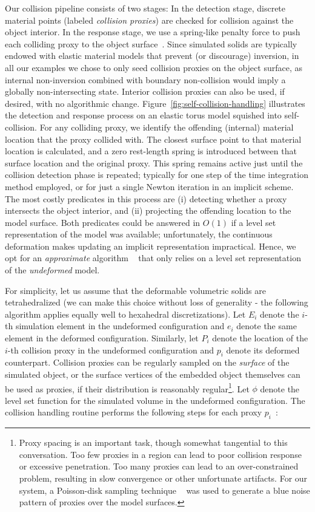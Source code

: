 Our collision pipeline consists of two stages: In the detection stage,
discrete material points (labeled \emph{collision proxies}) are
checked for collision against the object interior. In the response
stage, we use a spring-like penalty force to push each colliding proxy
to the object surface~\citep{TeranSIF:2005,McAdaZSETTS:2011}. Since
simulated solids are typically endowed with elastic material models
that prevent (or discourage) inversion, in all our examples we chose
to only seed collision proxies on the object surface, as internal
non-inversion combined with boundary non-collision would imply a
globally non-intersecting state. Interior collision proxies can also
be used, if desired, with no algorithmic
change. Figure~\ref{fig:self-collision-handling} illustrates the
detection and response process on an elastic torus model squished into
self-collision. For any colliding proxy, we identify the offending
(internal) material location that the proxy collided with. The closest
surface point to that material location is calculated, and a zero
rest-length spring is introduced between that surface location and the
original proxy. This spring remains active just until the collision
detection phase is repeated; typically for one step of the time
integration method employed, or for just a single Newton iteration in
an implicit scheme. The most costly predicates in this process are (i)
detecting whether a proxy intersects the object interior, and (ii)
projecting the offending location to the model surface. Both
predicates could be answered in $O(1)$ if a level set representation
of the model was available; unfortunately, the continuous deformation
makes updating an implicit representation impractical. Hence, we opt
for an \emph{approximate} algorithm ~\citep{McAdaZSETTS:2011} that only
relies on a level set representation of the \emph{undeformed} model.

For simplicity, let us assume that the deformable volumetric solids
are tetrahedralized (we can make this choice without loss of
generality - the following algorithm applies equally well to
hexahedral discretizations). Let $E_i$ denote the $i$-th simulation
element in the undeformed configuration and $e_i$ denote the same
element in the deformed configuration. Similarly, let $P_i$ denote the
location of the $i$-th collision proxy in the undeformed configuration
and $p_i$ denote its deformed counterpart.  Collision proxies can be
regularly sampled on the \emph{surface} of the simulated object, or
the surface vertices of the embedded object themselves can be used as
proxies, if their distribution is reasonably regular\footnote{Proxy
  spacing is an important task, though somewhat tangential to
  this conversation. Too few proxies in a region can lead to poor
  collision response or excessive penetration. Too many proxies can
  lead to an over-constrained problem, resulting in slow convergence or
  other unfortunate artifacts. For our system, a Poisson-disk
  sampling technique ~\citep{CorsiCS:2012,Devro:1986} was used to generate a blue noise pattern
of proxies over the model surfaces.}.  Let $\phi$
denote the level set function for the simulated volume in the
undeformed configuration. The collision handling routine performs the
following steps for each proxy $p_i$\ :

